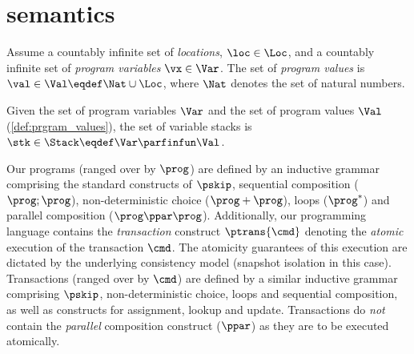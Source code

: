 \section{semantics\label{sec:semantics}}
\begin{definition}\label{def:prgram_values}
Assume a countably infinite set of \emph{locations}, $\loc \in \Loc$, and a countably infinite set of \emph{program variables} $\vx \in {\Var}$. The set of \emph{program values} is $\val \in \Val \eqdef \Nat \cup \Loc$, where $\Nat$ denotes the set of natural numbers.
\end{definition}
%
%
\begin{definition}[Stacks]\label{def:stacks}
Given the set of program variables $\Var$ and the set of program values $\Val$ (\ref{def:prgram_values}), the set of variable stacks is $\stk \in \Stack \eqdef \Var \parfinfun \Val$.
\end{definition}
%
%
Our programs (ranged over by $\prog$) are defined by an inductive grammar comprising the standard constructs of $\pskip$, sequential composition ($\prog; \prog$), non-deterministic choice ($\prog+\prog$), loops ($\prog^*$) and parallel composition ($\prog \ppar \prog$). Additionally, our programming language contains the \emph{transaction} construct $\ptrans{\cmd}$ denoting the \emph{atomic} execution of the transaction $\cmd$. The atomicity guarantees of this execution are dictated by the underlying consistency model (snapshot isolation in this case).
Transactions (ranged over by $\cmd$) are defined by a similar inductive grammar comprising $\pskip$, non-deterministic choice, loops and sequential composition, as well as constructs for assignment, lookup and update. Transactions do \emph{not} contain the \emph{parallel} composition construct ($\ppar$) as they are to be executed atomically.

